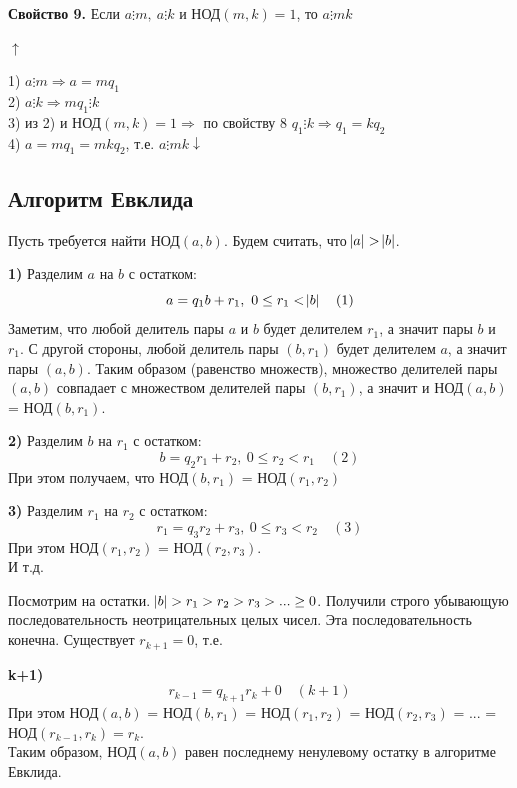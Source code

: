 \documentclass{article}
\begin{document}
            \textbf{Свойство 9.} Если \( a \vdots m,\ a \vdots k \) и \( \textrm{НОД}(m,k) = 1 \), то \(a \vdots mk \)

            \( \uparrow \)

            1) \( a \vdots m \Rightarrow a = mq_1 \)\\
            2) \( a \vdots k \Rightarrow mq_1 \vdots k \)\\
            3) из 2) и \( \textrm{НОД}(m,k) = 1 \Rightarrow \) по свойству 8 \( q_1 \vdots k \Rightarrow q_1 = kq_2 \)\\
            4) \( a = mq_1 = mkq_2 \), т.е. \( a \vdots mk \downarrow \)
            
        \subsection{Алгоритм Евклида}
        	Пусть требуется найти НОД\( (a,b) \). Будем считать, что \( \abs{a} > \abs{b} \).

            \textbf{1)} Разделим \( a \) на \( b \) с остатком: \[ a = q_1b + r_1,\ 0 \leq r_1 < \abs{b}\quad (1) \]
            Заметим, что любой делитель пары \( a \) и \( b \) будет делителем \( r_1 \), а значит пары \( b \) и \( r_1 \). С другой стороны, любой делитель пары \( (b,r_1) \) будет делителем \( a \), а значит пары \( (a,b) \). Таким образом (равенство множеств), множество делителей пары \( (a,b) \) совпадает с множеством делителей пары \( (b,r_1) \), а значит и НОД\( (a,b) \) = НОД\( (b,r_1) \).

            \textbf{2)} Разделим \( b \) на \( r_1 \) с остатком: \[ b = q_2r_1 + r_2,\ 0 \leq r_2 < r_1\quad (2) \]
            При этом получаем, что НОД\( (b,r_1) \) = НОД\( (r_1,r_2) \)

            \textbf{3)} Разделим \( r_1 \) на \( r_2 \) с остатком: \[ r_1 = q_3r_2 + r_3,\ 0 \leq r_3 < r_2\quad (3) \]
            При этом НОД\( (r_1, r_2) \) = НОД\( (r_2, r_3) \).\\
            И т.д.

            Посмотрим на остатки. \( \abs{b} > r_1 > r_2 > r_3 > ... \geq 0 \). Получили строго убывающую последовательность неотрицательных целых чисел. Эта последовательность конечна. Существует \( r_{k+1} = 0 \), т.е.

            \textbf{k+1)} \[ r_{k-1} = q_{k+1}r_k + 0\quad (k+1) \]
            При этом НОД\( (a,b) \) = НОД\( (b,r_1) \) = НОД\( (r_1,r_2) \) = НОД\( (r_2,r_3) \) = ... = НОД\( (r_{k-1},r_k) = r_k \).\\
            Таким образом, НОД\( (a,b) \) равен последнему ненулевому остатку в алгоритме Евклида.
\end{document}
